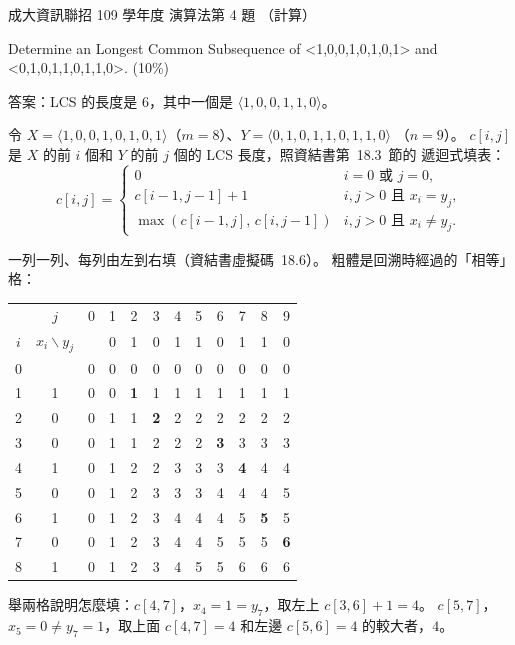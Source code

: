 \begin{pastexam}[label={px:ncku-109-prog-07}]{成大資訊聯招 109 學年度 演算法第 4 題}
（計算）

Determine an Longest Common Subsequence of <1,0,0,1,0,1,0,1> and <0,1,0,1,1,0,1,1,0>. (10\%)
\end{pastexam}

\begin{pastsoln}
答案：LCS 的長度是 $6$，其中一個是 $\langle 1, 0, 0, 1, 1, 0\rangle$。

令 $X = \langle 1,0,0,1,0,1,0,1\rangle$（$m = 8$）、$Y = \langle 0,1,0,1,1,0,1,1,0\rangle$
（$n = 9$）。 $c[i, j]$ 是 $X$ 的前 $i$ 個和 $Y$ 的前 $j$ 個的 LCS 長度，照資結書第~18.3~節的
遞迴式填表：
\[
c[i, j] =
\begin{cases}
0 & i = 0 \text{ 或 } j = 0,\\
c[i-1, j-1] + 1 & i, j > 0 \text{ 且 } x_i = y_j,\\
\max(c[i-1, j],\, c[i, j-1]) & i, j > 0 \text{ 且 } x_i \ne y_j.
\end{cases}
\]

一列一列、每列由左到右填（資結書虛擬碼~18.6）。 粗體是回溯時經過的「相等」格：
\begin{center}
\small
\begin{tabular}{cc|cccccccccc}
& $j$ & 0 & 1 & 2 & 3 & 4 & 5 & 6 & 7 & 8 & 9 \\
$i$ & $x_i \backslash y_j$ & & 0 & 1 & 0 & 1 & 1 & 0 & 1 & 1 & 0 \\ \hline
0 & & 0 & 0 & 0 & 0 & 0 & 0 & 0 & 0 & 0 & 0 \\
1 & 1 & 0 & 0 & \textbf{1} & 1 & 1 & 1 & 1 & 1 & 1 & 1 \\
2 & 0 & 0 & 1 & 1 & \textbf{2} & 2 & 2 & 2 & 2 & 2 & 2 \\
3 & 0 & 0 & 1 & 1 & 2 & 2 & 2 & \textbf{3} & 3 & 3 & 3 \\
4 & 1 & 0 & 1 & 2 & 2 & 3 & 3 & 3 & \textbf{4} & 4 & 4 \\
5 & 0 & 0 & 1 & 2 & 3 & 3 & 3 & 4 & 4 & 4 & 5 \\
6 & 1 & 0 & 1 & 2 & 3 & 4 & 4 & 4 & 5 & \textbf{5} & 5 \\
7 & 0 & 0 & 1 & 2 & 3 & 4 & 4 & 5 & 5 & 5 & \textbf{6} \\
8 & 1 & 0 & 1 & 2 & 3 & 4 & 5 & 5 & 6 & 6 & 6 \\
\end{tabular}
\end{center}
舉兩格說明怎麼填：$c[4, 7]$，$x_4 = 1 = y_7$，取左上 $c[3, 6] + 1 = 4$。 $c[5, 7]$，
$x_5 = 0 \ne y_7 = 1$，取上面 $c[4, 7] = 4$ 和左邊 $c[5, 6] = 4$ 的較大者，$4$。


\end{pastsoln}
